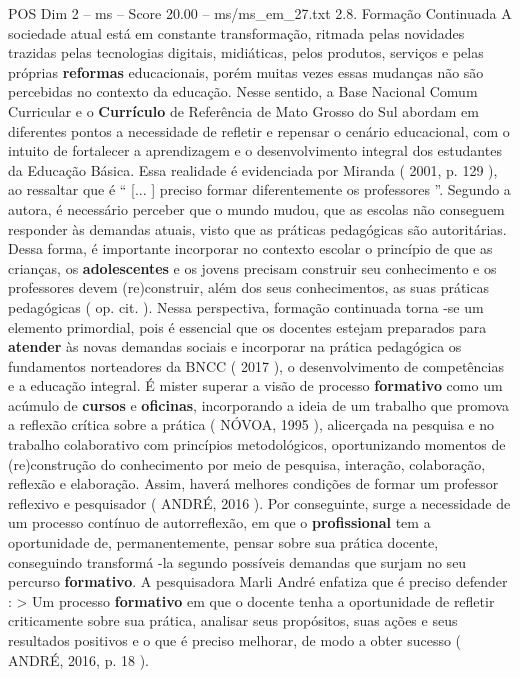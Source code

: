 \begin{textsample}{POS Dim 2 – ms – Score 20.00 – ms/ms\_em\_27.txt}  \label{ex:f2_pos_047}
2.8.
Formação Continuada A sociedade atual está em constante transformação, ritmada pelas novidades trazidas pelas tecnologias digitais, midiáticas, pelos produtos, serviços e pelas próprias \textbf{reformas} educacionais, porém muitas vezes essas mudanças não são percebidas no contexto da educação.
Nesse sentido, a Base Nacional Comum Curricular e o \textbf{Currículo} de Referência de Mato Grosso do Sul abordam em diferentes pontos a necessidade de refletir e repensar o cenário educacional, com o intuito de fortalecer a aprendizagem e o desenvolvimento integral dos estudantes da Educação Básica.
Essa realidade é evidenciada por Miranda ( 2001, p. 129 ), ao ressaltar que é “ [... ] preciso formar diferentemente os professores ”.
Segundo a autora, é necessário perceber que o mundo mudou, que as escolas não conseguem responder às demandas atuais, visto que as práticas pedagógicas são autoritárias.
Dessa forma, é importante incorporar no contexto escolar o princípio de que as crianças, os \textbf{adolescentes} e os jovens precisam construir seu conhecimento e os professores devem (re)construir, além dos seus conhecimentos, as suas práticas pedagógicas ( op. cit. ).
Nessa perspectiva, formação continuada torna -se um elemento primordial, pois é essencial que os docentes estejam preparados para \textbf{atender} às novas demandas sociais e incorporar na prática pedagógica os fundamentos norteadores da BNCC ( 2017 ), o desenvolvimento de competências e a educação integral.
É mister superar a visão de processo \textbf{formativo} como um acúmulo de \textbf{cursos} e \textbf{oficinas}, incorporando a ideia de um trabalho que promova a reflexão crítica sobre a prática ( NÓVOA, 1995 ), alicerçada na pesquisa e no trabalho colaborativo com princípios metodológicos, oportunizando momentos de (re)construção do conhecimento por meio de pesquisa, interação, colaboração, reflexão e elaboração.
Assim, haverá melhores condições de formar um professor reflexivo e pesquisador ( ANDRÉ, 2016 ).
Por conseguinte, surge a necessidade de um processo contínuo de autorreflexão, em que o \textbf{profissional} tem a oportunidade de, permanentemente, pensar sobre sua prática docente, conseguindo transformá -la segundo possíveis demandas que surjam no seu percurso \textbf{formativo}.
A pesquisadora Marli André enfatiza que é preciso defender : > Um processo \textbf{formativo} em que o docente tenha a oportunidade de refletir criticamente sobre sua prática, analisar seus propósitos, suas ações e seus resultados positivos e o que é preciso melhorar, de modo a obter sucesso ( ANDRÉ, 2016, p. 18 ).

\end{textsample}
